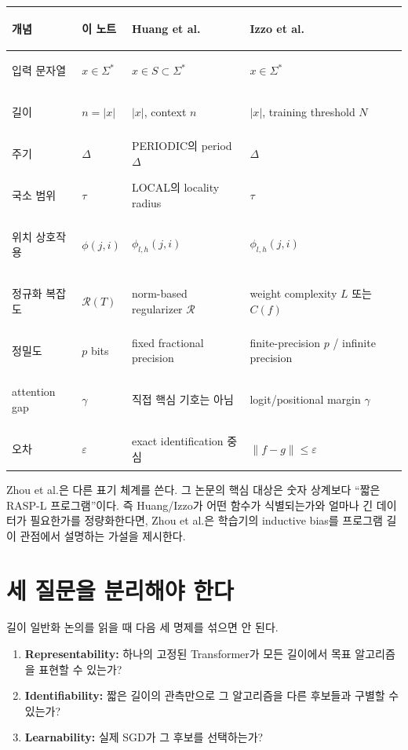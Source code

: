 \documentclass[11pt,a4paper,oneside,openany]{memoir}
\newcommand{\Risk}{\mathcal{R}}
\newcommand{\abs}[1]{\left\lvert #1\right\rvert}
\theoremstyle{definition}
\begin{document}
\begin{center}
\small
\begin{tabularx}{\textwidth}{>{\bfseries\raggedright\arraybackslash}p{}Y Y Y}
\toprule
개념 & 이 노트 & Huang et al. & Izzo et al. \\
\midrule
입력 문자열 & $x\in\Sigma^*$ & $x\in S\subset\Sigma^*$ & $x\in\Sigma^*$ \\
길이 & $n=\abs{x}$ & $|x|$, context $n$ & $|x|$, training threshold $N$ \\
주기 & $\Delta$ & PERIODIC의 period $\Delta$ & $\Delta$ \\
국소 범위 & $\tau$ & LOCAL의 locality radius & $\tau$ \\
위치 상호작용 & $\phi(j,i)$ & $\phi_{l,h}(j,i)$ & $\phi_{l,h}(j,i)$ \\
정규화 복잡도 & $\Risk(T)$ & norm-based regularizer $\Risk$ & weight complexity $L$ 또는 $C(f)$ \\
정밀도 & $p$ bits & fixed fractional precision & finite-precision $p$ / infinite precision \\
attention gap & $\gamma$ & 직접 핵심 기호는 아님 & logit/positional margin $\gamma$ \\
오차 & $\varepsilon$ & exact identification 중심 & $\|f-g\|\le\varepsilon$ \\
\bottomrule
\end{tabularx}
\end{center}

Zhou et al.은 다른 표기 체계를 쓴다. 그 논문의 핵심 대상은 숫자 상계보다 ``짧은 RASP-L 프로그램''이다.
즉 Huang/Izzo가 어떤 함수가 식별되는가와 얼마나 긴 데이터가 필요한가를 정량화한다면,
Zhou et al.은 학습기의 inductive bias를 프로그램 길이 관점에서 설명하는 가설을 제시한다.

\section{세 질문을 분리해야 한다}

길이 일반화 논의를 읽을 때 다음 세 명제를 섞으면 안 된다.

\begin{enumerate}
\item \textbf{Representability:} 하나의 고정된 Transformer가 모든 길이에서 목표 알고리즘을 표현할 수 있는가?
\item \textbf{Identifiability:} 짧은 길이의 관측만으로 그 알고리즘을 다른 후보들과 구별할 수 있는가?
\item \textbf{Learnability:} 실제 SGD가 그 후보를 선택하는가?
\end{enumerate}
\end{document}
